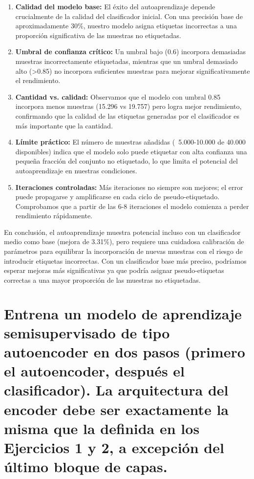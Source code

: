\documentclass{article}
\begin{document}
\begin{enumerate}
    \item \textbf{Calidad del modelo base:} El éxito del autoaprendizaje depende crucialmente de la calidad del clasificador inicial. Con una precisión base de aproximadamente 30\%, nuestro modelo asigna etiquetas incorrectas a una proporción significativa de las muestras no etiquetadas.
    
    \item \textbf{Umbral de confianza crítico:} Un umbral bajo (0.6) incorpora demasiadas muestras incorrectamente etiquetadas, mientras que un umbral demasiado alto (>0.85) no incorpora suficientes muestras para mejorar significativamente el rendimiento.
    
    \item \textbf{Cantidad vs. calidad:} Observamos que el modelo con umbral 0.85 incorpora menos muestras (15.296 vs 19.757) pero logra mejor rendimiento, confirmando que la calidad de las etiquetas generadas por el clasificador es más importante que la cantidad.
    
    \item \textbf{Límite práctico:} El número de muestras añadidas (~5.000-10.000 de 40.000 disponibles) indica que el modelo solo puede etiquetar con alta confianza una pequeña fracción del conjunto no etiquetado, lo que limita el potencial del autoaprendizaje en nuestras condiciones.
    
    \item \textbf{Iteraciones controladas:} Más iteraciones no siempre son mejores; el error puede propagarse y amplificarse en cada ciclo de pseudo-etiquetado. Comprobamos que a partir de las 6-8 iteraciones el modelo comienza a perder rendimiento rápidamente.
\end{enumerate}

En conclusión, el autoaprendizaje muestra potencial incluso con un clasificador medio como base (mejora de 3.31\%), pero requiere una cuidadosa calibración de parámetros para equilibrar la incorporación de nuevas muestras con el riesgo de introducir etiquetas incorrectas. Con un clasificador base más preciso, podríamos esperar mejoras más significativas ya que podría asignar pseudo-etiquetas correctas a una mayor proporción de las muestras no etiquetadas.



\newpage
\section{Entrena un modelo de aprendizaje semisupervisado de tipo autoencoder en dos pasos (primero el autoencoder, después el clasificador). La arquitectura del encoder debe ser exactamente la misma que la definida en los Ejercicios 1 y 2, a excepción del último bloque de capas.}
\end{document}
